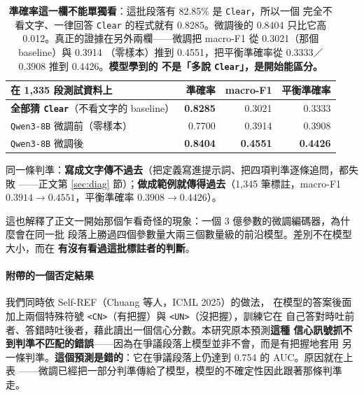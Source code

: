 \documentclass[11pt,a4paper]{ctexart}
\newcommand{\fn}[1]{\texttt{#1}}
\begin{document}
\begin{table}[h]
\centering\small
\begin{tabular}{@{}lrrr@{}}
\toprule
在 1{,}335 段測試資料上 & 準確率 & macro-F1 & 平衡準確率 \\
\midrule
\rowcolor{gray!12}
\textbf{全部猜 \fn{Clear}}（不看文字的 baseline） & \textbf{0.8285} & 0.3021 & 0.3333 \\
\fn{Qwen3-8B} 微調前（零樣本） & 0.7700 & 0.3914 & 0.3908 \\
\rowcolor{green!12}
\fn{Qwen3-8B} 微調後 & \textbf{0.8404} & \textbf{0.4551} & \textbf{0.4426} \\
\bottomrule
\end{tabular}
\caption{\textbf{準確率這一欄不能單獨看}：這批段落有 82.85\% 是 \fn{Clear}，所以一個
完全不看文字、一律回答 \fn{Clear} 的程式就有 0.8285。微調後的 0.8404 只比它高
0.012。真正的證據在另外兩欄——微調把 macro-F1 從 0.3021（那個 baseline）與 0.3914
（零樣本）推到 0.4551，把平衡準確率從 0.3333／0.3908 推到 0.4426。\textbf{模型學到的
不是「多說 \fn{Clear}」，是開始能區分。}}
\end{table}

\begin{tcolorbox}[colback=blue!5, colframe=blue!50]
同一條判準：\textbf{寫成文字傳不過去}（把定義寫進提示詞、把四項判準逐條追問，都失敗
——正文第 \ref{sec:diag} 節）；\textbf{做成範例就傳得過去}（1,345 筆標註，macro-F1
$0.3914 \to 0.4551$，平衡準確率 $0.3908 \to 0.4426$）。

\medskip
這也解釋了正文一開始那個乍看奇怪的現象：一個 3 億參數的微調編碼器，為什麼會在同一批
段落上勝過四個參數量大兩三個數量級的前沿模型。差別不在模型大小，而在
\textbf{有沒有看過這批標註者的判斷}。
\end{tcolorbox}

\paragraph{附帶的一個否定結果} 我們同時依 Self-REF（Chuang 等人，ICML 2025）的做法，
在模型的答案後面加上兩個特殊符號 \fn{<CN>}（有把握）與 \fn{<UN>}（沒把握），訓練它在
自己答對時吐前者、答錯時吐後者，藉此讀出一個信心分數。本研究原本預測\textbf{這種
信心訊號抓不到判準不匹配的錯誤}——因為在爭議段落上模型並非不會，而是有把握地套用
另一條判準。\textbf{這個預測是錯的}：它在爭議段落上仍達到 0.754 的 AUC。原因就在上表
——微調已經把一部分判準傳給了模型，模型的不確定性因此跟著那條判準走。
\end{document}
